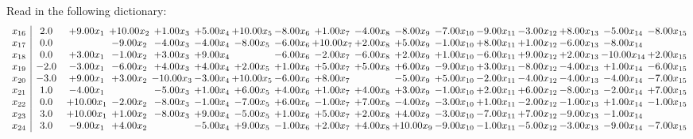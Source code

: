 \documentclass[9pt]{article}
\begin{document}
Read in the following dictionary:
\[\begin{array}{c| c c@{\hskip 2pt} c@{\hskip 2pt} c@{\hskip 2pt} c@{\hskip 2pt} c@{\hskip 2pt} c@{\hskip 2pt} c@{\hskip 2pt} c@{\hskip 2pt} c@{\hskip 2pt} c@{\hskip 2pt} c@{\hskip 2pt} c@{\hskip 2pt} c@{\hskip 2pt} c@{\hskip 2pt} c@{\hskip 2pt} }
 x_{16}   &  2.0 & +  9.00 x_{1} & + 10.00 x_{2} & +  1.00 x_{3} & +  5.00 x_{4} & + 10.00 x_{5} & -8.00 x_{6} & +  1.00 x_{7} & -4.00 x_{8} & -8.00 x_{9} & -7.00 x_{10} & -9.00 x_{11} & -3.00 x_{12} & +  8.00 x_{13} & -5.00 x_{14} & -8.00 x_{15}\\
 x_{17}   &  0.0  &   & -9.00 x_{2} & -4.00 x_{3} & -4.00 x_{4} & -8.00 x_{5} & -6.00 x_{6} & + 10.00 x_{7} & +  2.00 x_{8} & +  5.00 x_{9} & -1.00 x_{10} & +  8.00 x_{11} & +  1.00 x_{12} & -6.00 x_{13} & -8.00 x_{14} &   \\
 x_{18}   &  0.0 & +  3.00 x_{1} & -1.00 x_{2} & +  3.00 x_{3} & +  9.00 x_{4} &   & -6.00 x_{6} & -2.00 x_{7} & -6.00 x_{8} & +  2.00 x_{9} & +  1.00 x_{10} & -6.00 x_{11} & +  9.00 x_{12} & +  2.00 x_{13} & -10.00 x_{14} & +  2.00 x_{15}\\
 x_{19}   &  -2.0 & -3.00 x_{1} & -6.00 x_{2} & +  4.00 x_{3} & +  4.00 x_{4} & +  2.00 x_{5} & +  1.00 x_{6} & +  5.00 x_{7} & +  5.00 x_{8} & +  6.00 x_{9} & -9.00 x_{10} & +  3.00 x_{11} & -8.00 x_{12} & -4.00 x_{13} & +  1.00 x_{14} & -6.00 x_{15}\\
 x_{20}   &  -3.0 & +  9.00 x_{1} & +  3.00 x_{2} & -10.00 x_{3} & -3.00 x_{4} & + 10.00 x_{5} & -6.00 x_{6} & +  8.00 x_{7} &   & -5.00 x_{9} & +  5.00 x_{10} & -2.00 x_{11} & -4.00 x_{12} & -4.00 x_{13} & -4.00 x_{14} & -7.00 x_{15}\\
 x_{21}   &  1.0 & -4.00 x_{1} &   & -5.00 x_{3} & +  1.00 x_{4} & +  6.00 x_{5} & +  4.00 x_{6} & +  1.00 x_{7} & +  4.00 x_{8} & +  3.00 x_{9} & -1.00 x_{10} & +  2.00 x_{11} & +  6.00 x_{12} & -8.00 x_{13} & -2.00 x_{14} & +  7.00 x_{15}\\
 x_{22}   &  0.0 & + 10.00 x_{1} & -2.00 x_{2} & -8.00 x_{3} & -1.00 x_{4} & -7.00 x_{5} & +  6.00 x_{6} & -1.00 x_{7} & +  7.00 x_{8} & -4.00 x_{9} & -3.00 x_{10} & +  1.00 x_{11} & -2.00 x_{12} & -1.00 x_{13} & +  1.00 x_{14} & -1.00 x_{15}\\
 x_{23}   &  3.0 & + 10.00 x_{1} & +  1.00 x_{2} & -8.00 x_{3} & +  9.00 x_{4} & -5.00 x_{5} & +  1.00 x_{6} & +  5.00 x_{7} & +  2.00 x_{8} & +  4.00 x_{9} & -3.00 x_{10} & -7.00 x_{11} & +  7.00 x_{12} & -9.00 x_{13} & -1.00 x_{14} &   \\
 x_{24}   &  3.0 & -9.00 x_{1} & +  4.00 x_{2} &   & -5.00 x_{4} & +  9.00 x_{5} & -1.00 x_{6} & +  2.00 x_{7} & +  4.00 x_{8} & + 10.00 x_{9} & -9.00 x_{10} & -1.00 x_{11} & -5.00 x_{12} & -3.00 x_{13} & -9.00 x_{14} & -7.00 x_{15}\\

\end{array}\]
\end{document}
